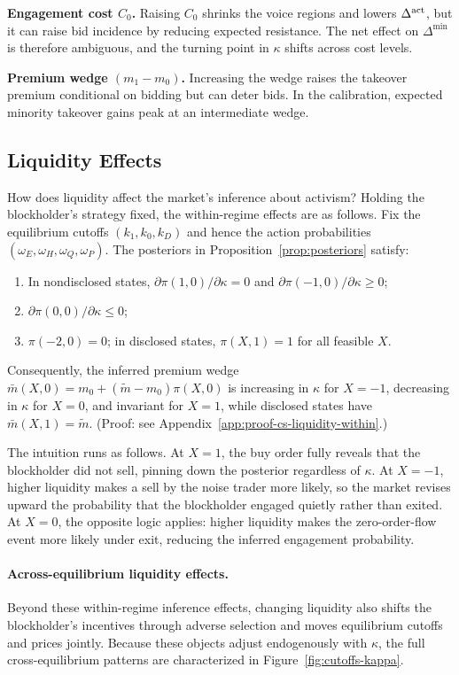 \documentclass[11pt]{article}
\newcommand{\1}{\mathbf{1}}
\begin{document}
\textbf{Engagement cost $C_0$.} Raising $C_0$ shrinks the voice regions and lowers $\Delta^{\textup{act}}$, but it can raise bid incidence by reducing expected resistance. The net effect on $\Delta^{\min}$ is therefore ambiguous, and the turning point in $\kappa$ shifts across cost levels.

\textbf{Premium wedge $(m_1 - m_0)$.} Increasing the wedge raises the takeover premium conditional on bidding but can deter bids. In the calibration, expected minority takeover gains peak at an intermediate wedge.

%
\subsection{Liquidity Effects}
%

How does liquidity affect the market's inference about activism? Holding the blockholder's strategy fixed, the within-regime effects are as follows. Fix the equilibrium cutoffs $(k_1,k_0,k_D)$ and hence the action probabilities $(\omega_E,\omega_H,\omega_Q,\omega_P)$. The posteriors in Proposition~\ref{prop:posteriors} satisfy:
\begin{enumerate}[label=\textup{(\alph*)},leftmargin=2em]
\item In nondisclosed states, $\partial \pi(1,0)/\partial \kappa = 0$ and $\partial \pi(-1,0)/\partial \kappa \ge 0$;
\item $\partial \pi(0,0)/\partial \kappa \le 0$;
\item $\pi(-2,0)=0$; in disclosed states, $\pi(X,1)=1$ for all feasible $X$.
\end{enumerate}
Consequently, the inferred premium wedge $\bar{m}(X,0)=m_0+(\tilde{m}-m_0)\pi(X,0)$ is increasing in $\kappa$ for $X=-1$, decreasing in $\kappa$ for $X=0$, and invariant for $X=1$, while disclosed states have $\bar{m}(X,1)=\tilde{m}$. (Proof: see Appendix~\ref{app:proof-cs-liquidity-within}.)

The intuition runs as follows. At $X=1$, the buy order fully reveals that the blockholder did not sell, pinning down the posterior regardless of $\kappa$. At $X=-1$, higher liquidity makes a sell by the noise trader more likely, so the market revises upward the probability that the blockholder engaged quietly rather than exited. At $X=0$, the opposite logic applies: higher liquidity makes the zero-order-flow event more likely under exit, reducing the inferred engagement probability.

\paragraph{Across-equilibrium liquidity effects.}
Beyond these within-regime inference effects, changing liquidity also shifts the blockholder's incentives through adverse selection and moves equilibrium cutoffs and prices jointly. Because these objects adjust endogenously with $\kappa$, the full cross-equilibrium patterns are characterized in Figure~\ref{fig:cutoffs-kappa}.
\end{document}
